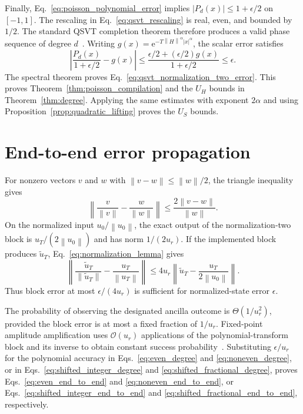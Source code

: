 \documentclass[aps,pra,reprint,floatfix,unsortedaddress,superscriptaddress]{revtex4-2}
\newcommand{\norm}[1]{\left\lVert#1\right\rVert}
\newcommand{\abs}[1]{\left\lvert#1\right\rvert}
\newcommand{\Ocal}{\mathcal{O}}
\begin{document}
Finally, Eq.~\eqref{eq:poisson_polynomial_error} implies
$\abs{P_d(x)}\leq1+\epsilon/2$ on $[-1,1]$.
The rescaling in Eq.~\eqref{eq:qsvt_rescaling} is real, even, and
bounded by $1/2$.  The standard QSVT completion theorem therefore
produces a valid phase sequence of degree $d$~\cite{Gilyen2019qsvt}.
Writing
$g(x)=\mathrm e^{-T\norm{H}^{\alpha}\abs{x}^{\alpha}}$, the scalar
error satisfies
\begin{equation}
\left|
\frac{P_d(x)}{1+\epsilon/2}-g(x)
\right|
\leq
\frac{\epsilon/2+(\epsilon/2)g(x)}{1+\epsilon/2}
\leq\epsilon.
\label{eq:normalization_two_scalar_bound}
\end{equation}
The spectral theorem proves
Eq.~\eqref{eq:qsvt_normalization_two_error}.  This proves
Theorem~\ref{thm:poisson_compilation} and the $U_H$ bounds in
Theorem~\ref{thm:degree}.  Applying the same estimates with exponent
$2\alpha$ and using Proposition~\ref{prop:quadratic_lifting} proves
the $U_S$ bounds.

\section{End-to-end error propagation}
\label{app:end_to_end}

For nonzero vectors $v$ and $w$ with
$\norm{v-w}\leq\norm{w}/2$, the triangle inequality gives
\begin{equation}
    \left\|
    \frac{v}{\norm{v}}-\frac{w}{\norm{w}}
    \right\|
    \leq \frac{2\norm{v-w}}{\norm{w}}.
    \label{eq:normalization_lemma}
\end{equation}
On the normalized input $u_0/\norm{u_0}$, the exact output of the
normalization-two block is
$u_T/(2\norm{u_0})$ and has norm $1/(2u_r)$.  If the implemented block
produces $\widetilde u_T$, Eq.~\eqref{eq:normalization_lemma} gives
\begin{equation}
    \left\|
    \frac{\widetilde u_T}{\norm{\widetilde u_T}}
    -
    \frac{u_T}{\norm{u_T}}
    \right\|
    \leq
    4u_r
    \left\|
    \widetilde u_T-\frac{u_T}{2\norm{u_0}}
    \right\|.
    \label{eq:normalized_state_perturbation}
\end{equation}
Thus block error at most $\epsilon/(4u_r)$ is sufficient for
normalized-state error $\epsilon$.

The probability of observing the designated ancilla outcome is
$\Theta(1/u_r^2)$, provided the block error is at most a fixed fraction
of $1/u_r$.  Fixed-point amplitude amplification uses
$\Ocal(u_r)$ applications of the polynomial-transform block and its
inverse to obtain
constant success probability~\cite{Yoder2014fixedpoint}.  Substituting
$\epsilon/u_r$ for the polynomial accuracy in
Eqs.~\eqref{eq:even_degree} and
\eqref{eq:noneven_degree}, or in
Eqs.~\eqref{eq:shifted_integer_degree} and
\eqref{eq:shifted_fractional_degree}, proves
Eqs.~\eqref{eq:even_end_to_end} and
\eqref{eq:noneven_end_to_end}, or
Eqs.~\eqref{eq:shifted_integer_end_to_end} and
\eqref{eq:shifted_fractional_end_to_end}, respectively.
\end{document}
